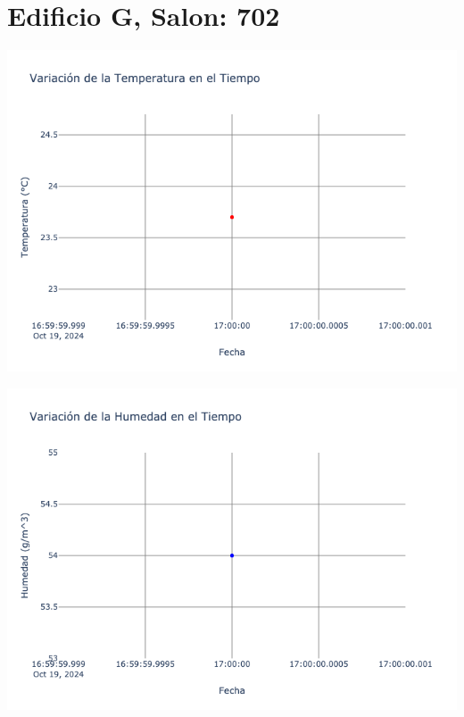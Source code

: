 \documentclass{article}
\begin{document}
    \section{Edificio G, Salon: 702}
    \noindent
    \begin{minipage}{0.48\textwidth}
        \centering
        \includegraphics[width=\textwidth]{../img/poli/TS702-90Dias-03-12-2024.png}
    \end{minipage}
    \hfill
    \begin{minipage}{0.48\textwidth}
        \centering
        \includegraphics[width=\textwidth]{../img/poli/HS702-90Dias-03-12-2024.png}
    \end{minipage}
\end{document}
